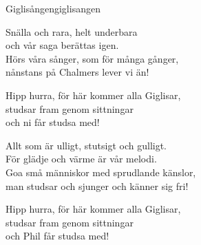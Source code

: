 \begin{song}{Giglisången}{giglisangen}
\begin{vers}
Snälla och rara, helt underbara\\
och vår saga berättas igen.\\ 
Hörs våra sånger, som för många gånger,\\
nånstans på Chalmers lever vi än!\\
\end{vers}
\begin{vers}
Hipp hurra, för här kommer alla Giglisar,\\
studsar fram genom sittningar\\
och ni får studsa med!\\
\end{vers}
\begin{vers}
Allt som är ulligt, stutsigt och gulligt.\\
För glädje och värme är vår melodi.\\
Goa små människor med sprudlande känslor,\\
man studsar och sjunger och känner sig fri!\\
\end{vers}
\begin{vers}
Hipp hurra, för här kommer alla Giglisar,\\
studsar fram genom sittningar\\
och Phil får studsa med!\\
\end{vers}
\end{song}